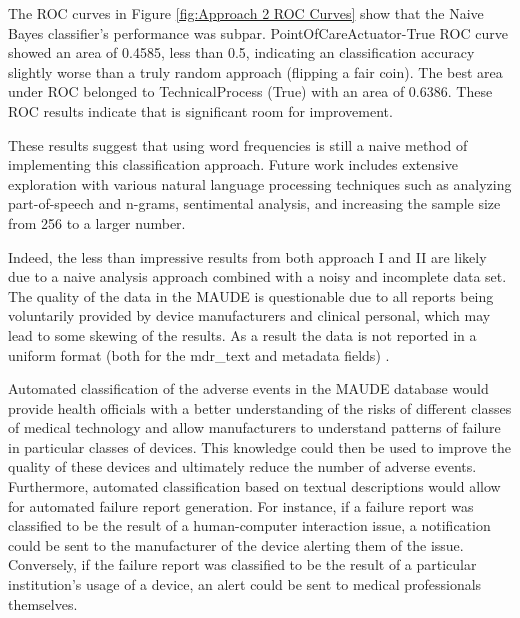 \documentclass[11pt, notitlepage,abstracton,oneside]{article}   	%
\begin{document}
The ROC curves in Figure \ref{fig:Approach 2 ROC Curves} show that the Naive Bayes classifier's performance was subpar. PointOfCareActuator-True ROC curve showed an area of 0.4585, less than 0.5, indicating an classification accuracy slightly worse than a truly random approach (flipping a fair coin). The best area under ROC belonged to TechnicalProcess (True) with an area of 0.6386. These ROC results indicate that is significant room for improvement. 

These results suggest that using word frequencies is still a naive method of implementing this classification approach. Future work includes extensive exploration with various natural language processing techniques such as analyzing part-of-speech and n-grams, sentimental analysis, and increasing the sample size from 256 to a larger number.

Indeed, the less than impressive results from both approach I and II are likely due to a naive analysis approach combined with a noisy and incomplete data set. The quality of the data in the MAUDE is questionable due to all reports being voluntarily provided by device manufacturers and clinical personal, which may lead to some skewing of the results. As a result the data is not reported in a uniform format (both for the mdr\_text and metadata fields) \cite{weber_preliminary_2011, fuller_electrosurgical_2012}. 

Automated classification of the adverse events in the MAUDE database would provide health officials with a better understanding of the risks of different classes of medical technology and allow manufacturers to understand patterns of failure in particular classes of devices. This knowledge could then be used to improve the quality of these devices and ultimately reduce the number of adverse events. Furthermore, automated classification based on textual descriptions would allow for automated failure report generation. For instance, if a failure report was classified to be the result of a human-computer interaction issue, a notification could be sent to the manufacturer of the device alerting them of the issue. Conversely, if the failure report was classified to be the result of a particular institution's usage of a device, an alert could be sent to medical professionals themselves.
\end{document}
